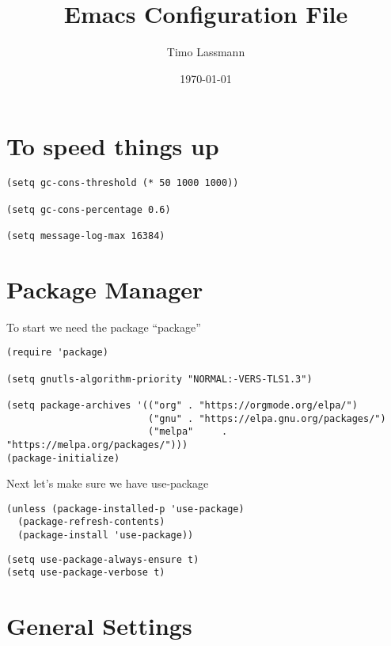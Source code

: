 \documentclass[12pt]{article}
\author{Timo Lassmann}
\date{\today}
\title{Emacs Configuration File}
\begin{document}
\maketitle

\section{To speed things up}
\label{sec:orgeb0439c}

\begin{verbatim}
(setq gc-cons-threshold (* 50 1000 1000))

(setq gc-cons-percentage 0.6)

(setq message-log-max 16384)

\end{verbatim}

\section{Package Manager}
\label{sec:orge5a5499}
To start we need the package ``package''

\begin{verbatim}
(require 'package)

(setq gnutls-algorithm-priority "NORMAL:-VERS-TLS1.3")

(setq package-archives '(("org" . "https://orgmode.org/elpa/")
                         ("gnu" . "https://elpa.gnu.org/packages/")
                         ("melpa"     . "https://melpa.org/packages/")))
(package-initialize)
\end{verbatim}

Next let's make sure we have use-package

\begin{verbatim}
(unless (package-installed-p 'use-package)
  (package-refresh-contents)
  (package-install 'use-package))
\end{verbatim}

\begin{verbatim}
(setq use-package-always-ensure t)
(setq use-package-verbose t)
\end{verbatim}

\section{General Settings}
\label{sec:org9a608b7}
\end{document}
